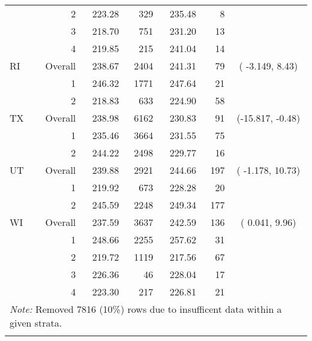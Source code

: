 \begin{longtable}{lrrr@{\extracolsep{.25cm}}rrc}
   & 2 & 223.28 & 329 & 235.48 &   8 &  \\ 
   & 3 & 218.70 & 751 & 231.20 &  13 &  \\ 
   & 4 & 219.85 & 215 & 241.04 &  14 &  \\ 
   \hline
RI & Overall & 238.67 & 2404 & 241.31 &  79 & ( -3.149,  8.43) \\ 
   & 1 & 246.32 & 1771 & 247.64 &  21 &  \\ 
   & 2 & 218.83 & 633 & 224.90 &  58 &  \\ 
   \hline
TX & Overall & 238.98 & 6162 & 230.83 &  91 & (-15.817, -0.48) \\ 
   & 1 & 235.46 & 3664 & 231.55 &  75 &  \\ 
   & 2 & 244.22 & 2498 & 229.77 &  16 &  \\ 
   \hline
UT & Overall & 239.88 & 2921 & 244.66 & 197 & ( -1.178, 10.73) \\ 
   & 1 & 219.92 & 673 & 228.28 &  20 &  \\ 
   & 2 & 245.59 & 2248 & 249.34 & 177 &  \\ 
   \hline
WI & Overall & 237.59 & 3637 & 242.59 & 136 & (  0.041,  9.96) \\ 
   & 1 & 248.66 & 2255 & 257.62 &  31 &  \\ 
   & 2 & 219.72 & 1119 & 217.56 &  67 &  \\ 
   & 3 & 226.36 &  46 & 228.04 &  17 &  \\ 
   & 4 & 223.30 & 217 & 226.81 &  21 &  \\ 
   \hline \multicolumn{7}{l}{\textit{Note:} Removed 7816 (10\%) rows due to insufficent data within a given strata.} \\\hline
\label{g4math-mlpsa-ctree}
\end{longtable}
